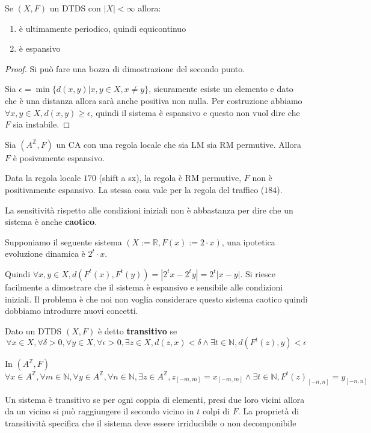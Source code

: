 \begin{nota}
    Se $(X,F)$ un DTDS con $|X|<\infty$ allora:
    \begin{enumerate}
        \item è ultimamente periodico, quindi equicontinuo
        \item è espansivo
    \end{enumerate}
    \begin{proof}
        Si può fare una bozza di dimostrazione del secondo punto.

        Sia $\epsilon = \min\{d(x,y)|x,y\in X, x\ne y\}$, sicuramente esiste un 
        elemento e dato che è una distanza allora sarà anche positiva non nulla.
        Per costruzione abbiamo $\forall x,y\in X, d(x,y)\ge \epsilon$, quindi il 
        sistema è espansivo e questo non vuol dire che $F$ sia instabile.
    \end{proof}
\end{nota}

\begin{teorema}
    Sia $(A^\mathbb{Z}, F)$ un CA con una regola locale  che sia LM sia RM permutive.
    Allora $F$ è posivamente espansivo.    
\end{teorema}

\begin{esempio}
    Data la regola locale $170$ (shift a sx), la regola è RM permutive, $F$ non è positivamente espansivo.
    La stessa cosa vale per la regola del traffico ($184$).
\end{esempio}

La sensitività rispetto alle condizioni iniziali non è abbastanza per dire che un
sistema è anche \textbf{caotico}.

\begin{esempio}
    Supponiamo il seguente sistema $(X:=\mathbb{R},F(x):= 2\cdot x)$, una ipotetica
    evoluzione dinamica è $2^t\cdot x$.

    Quindi $\forall x,y\in X, d(F^t(x),F^t(y)) = |2^tx-2^ty|= 2^t|x-y|$. Si riesce 
    facilmente a dimostrare che il sistema è espansivo e sensibile alle condizioni 
    iniziali. Il problema è che noi non voglia considerare questo sistema caotico 
    quindi dobbiamo introdurre nuovi concetti.
\end{esempio}

\begin{definizione}
    Dato un DTDS $(X,F)$ è detto \textbf{transitivo} se 
    $$\forall x\in X,\forall \delta >0, \forall y\in X,\forall \epsilon>0, \exists 
    z\in X, d(z,x)< \delta \land \exists t\in \mathbb{N},d(F^t(z),y)<\epsilon$$

    In $(A^\mathbb{Z},F)$
    $$\forall x\in A^\mathbb{Z},\forall m \in\mathbb{N}, \forall y\in A^\mathbb{Z},\forall n\in\mathbb{N}, \exists 
    z\in A^\mathbb{Z}, z_{[-m,m]} = x_{[-m,m]} \land \exists t\in \mathbb{N},F^t(z)_{[-n,n]} = y_{[-n,n]}$$

\end{definizione}
Un sistema è transitivo se per ogni coppia di elementi, presi due loro vicini allora 
da un vicino si può raggiungere il secondo vicino in $t$ colpi di $F$. La proprietà 
di transitività specifica che il sistema deve essere irriducibile o non decomponibile


